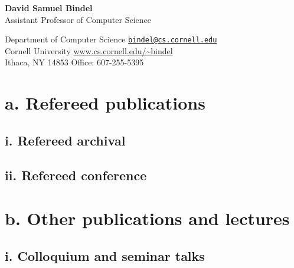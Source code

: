 \documentclass{article}
\begin{document}
\begin{center}
  {\Large \bf David Samuel Bindel} \\
  Assistant Professor of Computer Science
\end{center}

\begin{trivlist}
\item
Department of Computer Science
  \hfill \href{mail:bindel@cs.cornell.edu}{\tt bindel@cs.cornell.edu} \\
Cornell University
  \hfill \url{www.cs.cornell.edu/~bindel} \\
Ithaca, NY 14853
  \hfill Office: 607-255-5395
\end{trivlist}



\section*{a. Refereed publications}

\subsection*{i. Refereed archival}



\subsection*{ii. Refereed conference}




\section*{b. Other publications and lectures}

\subsection*{i. Colloquium and seminar talks}
\end{document}
